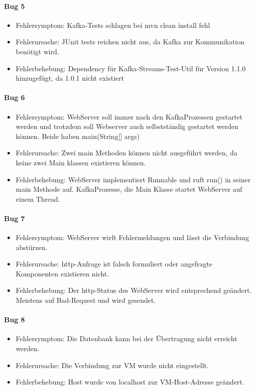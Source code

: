 \paragraph{Bug 5}
\begin{itemize}
	\item Fehlersymptom: Kafka-Tests schlagen bei mvn clean install fehl
	\item Fehlerursache: JUnit tests reichen nicht aus, da Kafka zur Kommunikation benötigt wird.
	\item Fehlerbehebung: Dependency für Kafka-Streams-Test-Util für Version 1.1.0 hinzugefügt, da 1.0.1 nicht existiert
\end{itemize}

\paragraph{Bug 6}
\begin{itemize}
	\item Fehlersymptom: WebServer soll immer nach den KafkaProzessen gestartet werden und trotzdem soll Webserver auch selbstständig gestartet werden können.
	Beide haben main(String[] args)
	\item Fehlerursache: Zwei main Methoden können nicht ausgeführt werden, da keine zwei Main klassen existieren können.
	\item Fehlerbehebung: WebServer implementiert Runnable und ruft run() in seiner main Methode auf.
	KafkaProzesse, die Main Klasse startet WebServer auf einem Thread.
\end{itemize}

\paragraph{Bug 7}
\begin{itemize}
	\item Fehlersymptom: WebServer wirft Fehlermeldungen und lässt die Verbindung abstürzen.
	\item Fehlerursache: http-Anfrage ist falsch formuliert oder angefragte Komponenten existieren nicht.
	\item Fehlerbehebung: Der http-Status des WebServer wird entsprechend geändert. Meistens auf Bad-Request und wird gesendet.
\end{itemize}

\paragraph{Bug 8}
\begin{itemize}
	\item Fehlersymptom: Die Datenbank kann bei der Übertragung nicht erreicht werden.
	\item Fehlerursache: Die Verbindung zur VM wurde nicht eingestellt.
	\item Fehlerbehebung: Host wurde von localhost zur VM-Host-Adresse geändert.
\end{itemize}


